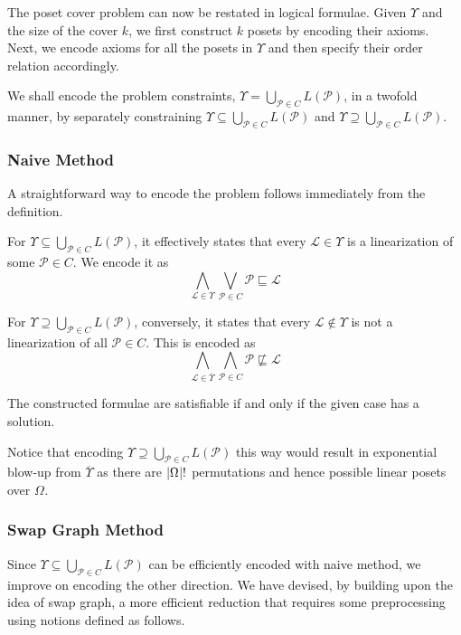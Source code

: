 \documentclass[12pt]{llncs}
\DeclarePairedDelimiter{\abs}{\lvert}{\rvert}
\newcommand{\poset}[1]{\mathcal{#1}}
\newcommand{\uni}[1][]{\Omega_{#1}}
\newcommand{\lang}[1]{L(#1)}
\newcommand{\lext}{\sqsubseteq}
\newcommand{\complmt}[1]{\overline{#1}}
\begin{document}
The poset cover problem can now be restated in logical formulae. Given $\Upsilon$ and the size of the cover $k$, we first construct $k$ posets by encoding their axioms. Next, we encode axioms for all the posets in $\Upsilon$ and then specify their order relation accordingly.

We shall encode the problem constraints, $\Upsilon = \bigcup_{\poset{P} \in C} \lang{\poset{P}}$, in a twofold manner, by separately constraining $\Upsilon \subseteq \bigcup_{\poset{P} \in C} \lang{\poset{P}}$ and $\Upsilon \supseteq \bigcup_{\poset{P} \in C} \lang{\poset{P}}$.

\subsubsection{Naive Method} A straightforward way to encode the problem follows immediately from the definition.

For $\Upsilon \subseteq \bigcup_{\poset{P} \in C} \lang{\poset{P}}$, it effectively states that every $\poset{L} \!\in\! \Upsilon$ is a linearization of some $\poset{P} \!\in\! C$. We encode it as
\[
\bigwedge_{\poset{L} \in \Upsilon} \bigvee_{\poset{P} \in C} \poset{P} \lext \poset{L}
\]

For $\Upsilon \supseteq \bigcup_{\poset{P} \in C} \lang{\poset{P}}$, conversely, it states that every $\poset{L} \!\not\in\! \Upsilon$ is not a linearization of all $\poset{P} \!\in\! C$. This is encoded as
\[
\bigwedge_{\poset{L} \in \complmt{\Upsilon}} \bigwedge_{\poset{P} \in C} \poset{P} \not\lext \poset{L}
\]

\begin{theorem}
    The constructed formulae are satisfiable if and only if the given case has a solution.
\end{theorem}

Notice that encoding $\Upsilon \supseteq \bigcup_{\poset{P} \in C} \lang{\poset{P}}$ this way would result in exponential blow-up from $\complmt{\Upsilon}$ as there are $\abs{\uni}!$ permutations and hence possible linear posets over $\uni$.

\subsubsection{Swap Graph Method}
Since $\Upsilon \subseteq \bigcup_{\poset{P} \in C} \lang{\poset{P}}$ can be efficiently encoded with naive method, we improve on encoding the other direction. We have devised, by building upon the idea of swap graph, a more efficient reduction that requires some preprocessing using notions defined as follows.
\end{document}
